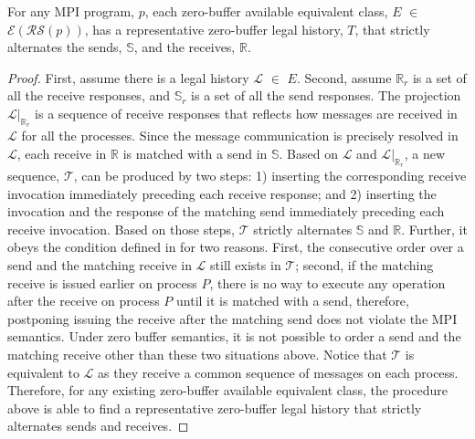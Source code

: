 
\begin{theorem}
For any MPI program, $\mathit{p}$, each zero-buffer available equivalent class, $\mathit{E}$ $\in$ $\mathcal{E}(\mathcal{RS}(\mathit{p}))$, has a representative zero-buffer legal history, $T$, that strictly alternates the sends, $\mathbb{S}$, and the receives, $\mathbb{R}$.
\end{theorem}

\begin{proof}
First, assume there is a legal history $\mathcal{L}$ $\in$ $\mathit{E}$. Second, assume $\mathbb{R}_r$ is a set of all the receive responses, and $\mathbb{S}_r$ is a set of all the send responses. The projection $\mathcal{L} | _{\mathbb{R}_r}$ is a sequence of receive responses that reflects how messages are received in $\mathcal{L}$ for all the processes. Since the message communication is precisely resolved in $\mathcal{L}$, each receive in $\mathbb{R}$ is matched with a send in $\mathbb{S}$. Based on $\mathcal{L}$ and $\mathcal{L} | _{\mathbb{R}_r}$, a new sequence, $\mathcal{T}$, can be produced by two steps: 1) inserting the corresponding receive invocation immediately preceding each receive response; and 2) inserting the invocation and the response of the matching send immediately preceding each receive invocation. Based on those steps, $\mathcal{T}$ strictly alternates $\mathbb{S}$ and $\mathbb{R}$. Further, it obeys the condition defined in  for two reasons. First, the consecutive order over a send and the matching receive in $\mathcal{L}$ still exists in $\mathcal{T}$; second, if the matching receive is issued earlier on process $P$, there is no way to execute any operation after the receive on process $P$ until it is matched with a send, therefore, postponing issuing the receive after the matching send does not violate the MPI semantics. Under zero buffer semantics, it is not possible to order a send and the matching receive other than these two situations above. Notice that $\mathcal{T}$ is equivalent to $\mathcal{L}$ as they receive a common sequence of messages on each process. Therefore, for any existing zero-buffer available equivalent class, the procedure above is able to find a representative zero-buffer legal history that strictly alternates sends and receives. 
\end{proof}
